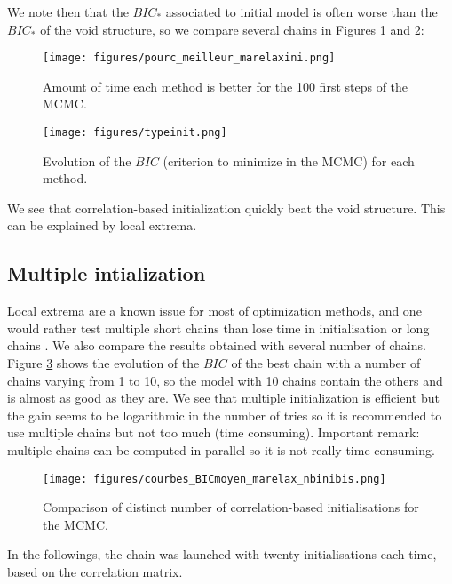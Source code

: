\documentclass[12pt,a4paper]{report}
\begin{document}
		We note then that the $BIC_*$ associated to initial model is often worse than the $BIC_*$ of the void structure, so we compare several chains in Figures \ref{pourcini} and \ref{Bicini}:			
			
	\begin{center}
		\begin{figure}[h!]
		\centering
		\texttt{[image: figures/pourc\_meilleur\_marelaxini.png]} 
		\caption{Amount of time each method is better for the 100 first steps of the MCMC. } \label{pourcini}
		\end{figure}		
	\end{center}
	
	\begin{center}
		\begin{figure}[h!]
		\centering
		\texttt{[image: figures/typeinit.png]} %
		\caption{Evolution of the $BIC$ (criterion to minimize in the MCMC) for each method.}\label{Bicini}
		\end{figure}
	\end{center}
	We see that correlation-based initialization quickly beat the void structure. This can be explained by local extrema.
	\FloatBarrier
		\subsection{Multiple intialization}	
		Local extrema are a known issue for most of optimization methods, and one would rather test multiple short chains than lose time in initialisation or long chains \cite{gilks1996markov}. 
		We also compare the results obtained with several number of chains. Figure \ref{nbini} shows the evolution of the $BIC$ of the best chain with a number of chains varying from 1 to 10, so the model with 10 chains contain the others and is almost as good as they are. We see that multiple initialization is efficient but the gain seems to be logarithmic in the number of tries so it is recommended to use multiple chains but not too much (time consuming). Important remark: multiple chains can be computed in parallel so it is not really time consuming.		
			
	\begin{center}
	\begin{figure}[h!]
	\centering
		\texttt{[image: figures/courbes\_BICmoyen\_marelax\_nbinibis.png]} 
		\caption{Comparison of distinct number of correlation-based initialisations for the MCMC.}\label{nbini}
	\end{figure}
	\end{center}
		In the followings, the chain was launched with twenty initialisations each time, based on the correlation matrix.
\end{document}
